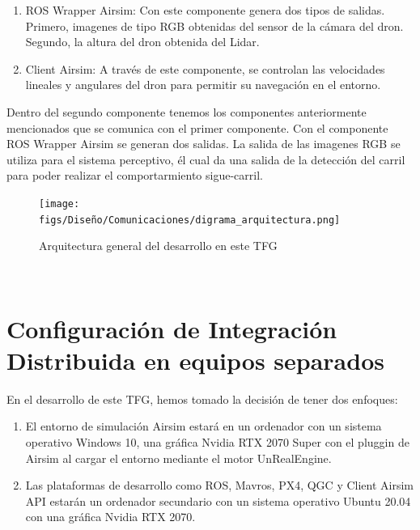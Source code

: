 \begin{enumerate}
  \item ROS Wrapper Airsim: Con este componente genera dos tipos de salidas. Primero, imagenes de tipo RGB obtenidas del sensor de la cámara 
  del dron. Segundo, la altura del dron obtenida del Lidar.

  \item Client Airsim: A través de este componente, se controlan las velocidades lineales y angulares del dron para permitir su navegación en el entorno.
\end{enumerate}

Dentro del segundo componente tenemos los componentes anteriormente mencionados que se comunica con el primer componente. Con el componente ROS Wrapper Airsim 
se generan dos salidas. La salida de las imagenes RGB se utiliza para el sistema perceptivo, él cual da una salida de la detección del carril para poder 
realizar el comportarmiento sigue-carril. 



\begin{figure} [H]
    \begin{center}
      \texttt{[image: figs/Diseño/Comunicaciones/digrama\_arquitectura.png]}
    \end{center}
    \caption{Arquitectura general del desarrollo en este TFG}
    \label{fig:infraestructura}
  \end{figure}\

\section{Configuración de Integración Distribuida en equipos separados}
En el desarrollo de este TFG, hemos tomado la decisión de tener dos enfoques:

\begin{enumerate}
  \item El entorno de simulación Airsim estará en un ordenador con un sistema operativo Windows 10, una gráfica Nvidia RTX 2070 Super con el pluggin de 
  Airsim al cargar el entorno mediante el motor UnRealEngine.
  \item Las plataformas de desarrollo como ROS, Mavros, PX4, QGC y Client Airsim API estarán un  ordenador secundario con un sistema operativo Ubuntu 20.04 con una gráfica Nvidia RTX
  2070.
\end{enumerate}

